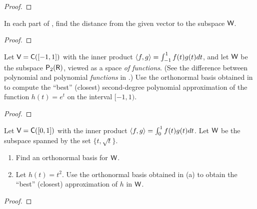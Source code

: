 \begin{proof}
\end{proof}

\begin{exercise} \label{exercise 6.2.20}
In each part of , find the distance from the given vector to the subspace \(\textsf{W}\).
\end{exercise}

\begin{proof}
\end{proof}

\begin{exercise} \label{exercise 6.2.21}
Let \(\textsf{V} = \textsf{C}([-1, 1])\) with the inner product \(\left< f,g \right> = \int_{-1}^1 f(t)g(t) dt\), and let \(\textsf{W}\) be the subspace \(\textsf{P}_2(\textsf{R})\), viewed as a space \emph{of functions}.
(See the difference between polynomial and polynomial \emph{functions} in .)
Use the orthonormal basis obtained in  to compute the ``best'' (closest) second-degree polynomial approximation of the function \(h(t) = e^t\) on the interval \([-1, 1)\).
\end{exercise}

\begin{proof}
\end{proof}

\begin{exercise} \label{exercise 6.2.22}
Let \(\textsf{V} = \textsf{C}([0, 1])\) with the inner product \(\left< f, g \right> = \int_0^1 f(t)g(t) dt\).
Let \(\textsf{W}\) be the subspace spanned by the \LID{} set \(\{ t, \sqrt{t} \}\).
\begin{enumerate}
\item Find an orthonormal basis for \(\textsf{W}\).
\item Let \(h(t) = t^2\).
Use the orthonormal basis obtained in (a) to obtain the ``best'' (closest) approximation of \(h\) in \(\textsf{W}\).
\end{enumerate}
\end{exercise}

\begin{proof}
\end{proof}


